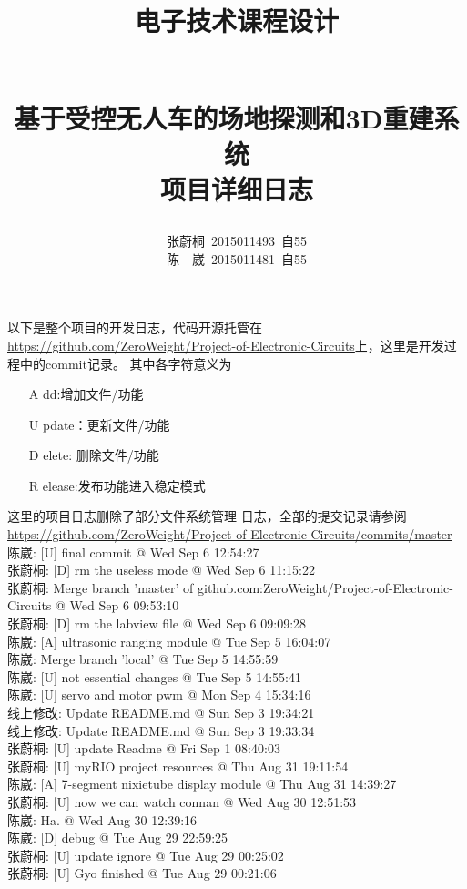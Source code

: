 \documentclass[a4paper]{paper}
\title{
    \begin{large}电子技术课程设计\end{large}\\
    基于受控无人车的场地探测和3D重建系统\\
    项目详细日志
}
\author{
    张蔚桐\ 2015011493\ 自55\\
    陈　崴\ 2015011481\ 自55
}
\begin{document}
\maketitle

以下是整个项目的开发日志，代码开源托管在\url{https://github.com/ZeroWeight/Project-of-Electronic-Circuits}上，这里是开发过程中的commit记录。
其中各字符意义为\begin{itemize}\item [A]dd:增加文件/功能 \item[U]pdate：更新文件/功能 \item [D]elete:
删除文件/功能 \item [R]elease:发布功能进入稳定模式 \end{itemize}这里的项目日志删除了部分文件系统管理
日志，全部的提交记录请参阅\url{https://github.com/ZeroWeight/Project-of-Electronic-Circuits/commits/master}\\ 
陈崴: [U] final commit @ Wed Sep 6 12:54:27\\ 
张蔚桐: [D] rm the useless mode @ Wed Sep 6 11:15:22\\ 
张蔚桐: Merge branch 'master' of github.com:ZeroWeight/Project-of-Electronic-Circuits @ Wed Sep 6 09:53:10\\ 
张蔚桐: [D] rm the labview file @ Wed Sep 6 09:09:28\\ 
陈崴: [A] ultrasonic ranging module @ Tue Sep 5 16:04:07\\ 
陈崴: Merge branch 'local' @ Tue Sep 5 14:55:59\\ 
陈崴: [U] not essential changes @ Tue Sep 5 14:55:41\\ 
陈崴: [U] servo and motor pwm @ Mon Sep 4 15:34:16\\ 
线上修改: Update README.md @ Sun Sep 3 19:34:21\\ 
线上修改: Update README.md @ Sun Sep 3 19:33:34\\ 
张蔚桐: [U] update Readme @ Fri Sep 1 08:40:03\\  
张蔚桐: [U] myRIO project resources @ Thu Aug 31 19:11:54\\ 
陈崴: [A] 7-segment nixietube display module @ Thu Aug 31 14:39:27\\  
张蔚桐: [U] now we can watch connan @ Wed Aug 30 12:51:53\\ 
陈崴: Ha. @ Wed Aug 30 12:39:16\\ 
陈崴: [D] debug @ Tue Aug 29 22:59:25\\ 
张蔚桐: [U] update ignore @ Tue Aug 29 00:25:02\\ 
张蔚桐: [U] Gyo finished @ Tue Aug 29 00:21:06\\ 
\end{document}
